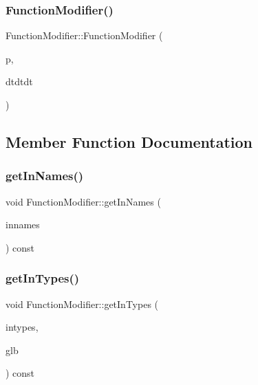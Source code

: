 \subsubsection{\texorpdfstring{FunctionModifier()}{FunctionModifier()}}
{\footnotesize\ttfamily Function\+Modifier\+::\+Function\+Modifier (\begin{DoxyParamCaption}\item[{const vector$<$ \mbox{\hyperlink{class_type_declarator}{Type\+Declarator}} $\ast$ $>$ $\ast$}]{p,  }\item[{bool}]{dtdtdt }\end{DoxyParamCaption})}



\subsection{Member Function Documentation}
\mbox{\label{class_function_modifier_aeffb53f85aa72f9a66da32258bb3d1f6}} 
\subsubsection{\texorpdfstring{getInNames()}{getInNames()}}
{\footnotesize\ttfamily void Function\+Modifier\+::get\+In\+Names (\begin{DoxyParamCaption}\item[{vector$<$ string $>$ \&}]{innames }\end{DoxyParamCaption}) const}

\mbox{\label{class_function_modifier_adc403e7630c661e26e98fd804778df4c}} 
\subsubsection{\texorpdfstring{getInTypes()}{getInTypes()}}
{\footnotesize\ttfamily void Function\+Modifier\+::get\+In\+Types (\begin{DoxyParamCaption}\item[{vector$<$ \mbox{\hyperlink{class_datatype}{Datatype}} $\ast$ $>$ \&}]{intypes,  }\item[{\mbox{\hyperlink{class_architecture}{Architecture}} $\ast$}]{glb }\end{DoxyParamCaption}) const}

